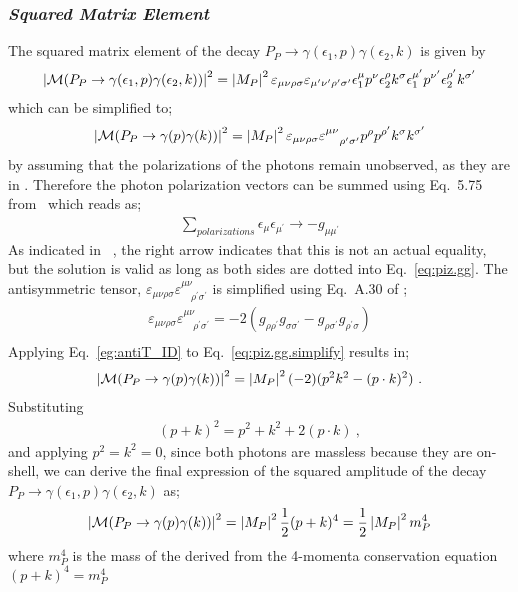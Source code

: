 \subsubsection{\emph{Squared Matrix Element}}\label{subsec:etaPMartix}
The squared matrix element of the decay $P_P \to \gamma(\epsilon_1,p) \gamma(\epsilon_2,k)$ is given by
\begin{align}\label{eq:piz.gg}
\left|{\cal  M}(P_{P}\rightarrow\gamma(\epsilon_{1},p)\gamma(\epsilon_{2},k))\right|^{2}=\left|M_{P}\right|^{2}\varepsilon_{\mu\nu\rho\sigma}\varepsilon_{\mu^{\prime}\nu^{\prime}\rho^{\prime}\sigma^{\prime}}\epsilon_{1}^{\mu}p^{\nu}\epsilon_{2}^{\rho}k^{\sigma}\epsilon_{1}^{\mu^{\prime}}p^{\nu^{\prime}}\epsilon_{2}^{\rho^{\prime}}k^{\sigma^{\prime}}
%
\end{align}
which can be simplified to;
\begin{align}\label{eq:piz.gg.simplify}
\left|{\cal M}(P_{P}\to\gamma(p)\gamma(k))\right|^{2}=\left|M_{P}\right|^{2}\varepsilon_{\mu\nu\rho\sigma}\varepsilon^{\mu\nu}_{\quad \rho^{\prime}\sigma^{\prime}}p^{\rho}p^{\rho^{\prime}}k^{\sigma}k^{\sigma^{\prime}}
%
\end{align}
by assuming that the polarizations of the photons remain unobserved, as they are in . Therefore the photon polarization vectors can be summed using Eq.~5.75 from~\cite{peskin} which reads as;
\begin{align}
\sum\limits_{polarizations} \epsilon_{\mu} \epsilon_{\mu^{\prime}} \to -g_{\mu\mu^{\prime}} 
\end{align}
As indicated in ~\cite{peskin}, the right arrow indicates that this is not an actual equality, but the solution is valid as long as both sides are dotted into Eq.~\ref{eq:piz.gg}. The antisymmetric tensor, $\varepsilon_{\mu\nu\rho\sigma}\varepsilon^{\mu\nu}_{\quad \rho^{\prime}\sigma^{\prime}}$ is simplified using  Eq.~A.30 of \cite{peskin}; 
\begin{align}\label{eg:antiT_ID}
\varepsilon_{\mu\nu\rho\sigma}\varepsilon^{\mu\nu}_{\quad \rho^{\prime}\sigma^{\prime}} = -2(g_{\rho\rho^{\prime}}g_{\sigma\sigma^{\prime}} - g_{\rho\sigma^{\prime}}g_{\rho^{\prime}\sigma})\\
\end{align}
Applying Eq.~\ref{eg:antiT_ID} to Eq.~\ref{eq:piz.gg.simplify} results in;
\begin{align}\label{eq:piz.gg.reduced}
\left|{\cal M}(P_{P}\to\gamma(p)\gamma(k))\right|^{2}=\left|M_{P}\right|^{2}(-2)(p^2k^2 - (p\cdot k)^2) \ .
%
\end{align}
Substituting
\begin{align}
(p + k)^2 = p^2 + k^2 +2 (p\cdot k) \ ,
\end{align}
and applying $p^2= k^2=0$, since both photons are massless because they are on-shell, we can derive the final expression of the squared amplitude of the decay $P_P \to \gamma(\epsilon_1,p) \gamma(\epsilon_2,k)$ as;
\begin{align}\label{eq:piz_gg_amp_final}
\left|{\cal M}(P_{P}\to\gamma(p)\gamma(k))\right|^{2}= \left|M_{P}\right|^{2}\frac{1}{2}(p+k)^{4} = \frac{1}{2}\left|M_{P}\right|^{2}m_{P}^{4}
\end{align}
where $m_P^4$ is the mass of the \etaTP derived from the 4-momenta conservation equation $(p+k)^4 = m_P^4$
